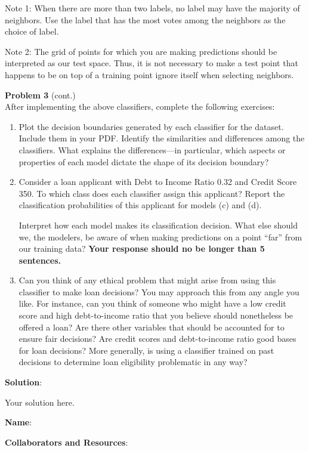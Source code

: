 \documentclass[submit]{../harvardml}
\newenvironment{solution}{
    \vspace{2mm}
    \color{blue}\noindent\textbf{Solution}:
}{}
\begin{document}
\begin{problem}
\begin{enumerate}[label=\alph*)]
        Note 1: When there are more than two labels, no label may have the
        majority of neighbors.  Use the label that has the most votes among
        the neighbors as the choice of label.

        Note 2: The grid of points for which you are making predictions
        should be interpreted as our test space.  Thus, it is not necessary
        to make a test point that happens to be on top of a training point
        ignore itself when selecting neighbors.

\end{enumerate}
\end{problem}

\newpage

\begin{framed}
  \noindent\textbf{Problem 3} (cont.)\\

After implementing the above classifiers, complete the following exercises:
  \begin{enumerate}



      \item Plot the decision boundaries generated by each classifier for the dataset. Include them in your PDF.
            Identify the similarities and differences among the classifiers. What explains the differences---in particular, which aspects or properties of each model dictate the shape of its decision boundary?
    
      \item
    
            Consider a loan applicant with Debt to Income Ratio 0.32 and Credit Score 350. To which class does each classifier assign this applicant? Report the classification probabilities of this applicant for models (c) and (d).
            
            Interpret how each model makes its classification decision. What else should we, the modelers, be aware of when making predictions on a point “far” from our training data? \textbf{Your response should no be longer than 5 sentences.}

    \item
        Can you think of any ethical problem that might arise from using this classifier to make loan decisions? You may approach this from any angle you like. For instance, can you think of someone who might have a low credit score and high debt-to-income ratio that you believe should nonetheless be offered a loan? Are there other variables that should be accounted for to ensure fair decisions? Are credit scores and debt-to-income ratio good bases for loan decisions? More generally, is using a classifier trained on past decisions to determine loan eligibility problematic in any way?
    \end{enumerate}
\end{framed}

\newpage

\begin{solution}
	Your solution here.
\end{solution}

\newpage

\textbf{Name}:

\textbf{Collaborators and Resources}: 
\end{document}

